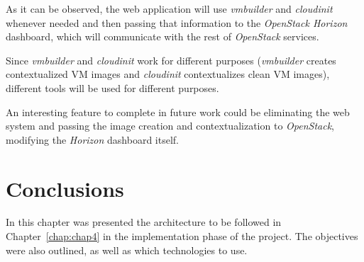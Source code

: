 As it can be observed, the web application will use \textit{vmbuilder} and \textit{cloudinit} whenever needed and then passing that information to the \textit{OpenStack Horizon} dashboard, which will communicate with the rest of \textit{OpenStack} services.

Since \textit{vmbuilder} and \textit{cloudinit} work for different purposes (\textit{vmbuilder} creates contextualized VM images and \textit{cloudinit} contextualizes clean VM images), different tools will be used for different purposes.



An interesting feature to complete in future work could be eliminating the web system and passing the image creation and contextualization to \textit{OpenStack}, modifying the \textit{Horizon} dashboard itself.
 


\section{Conclusions}

In this chapter was presented the architecture to be followed in Chapter~\ref{chap:chap4} in the implementation phase of the project. The objectives were also outlined, as well as which technologies to use.
